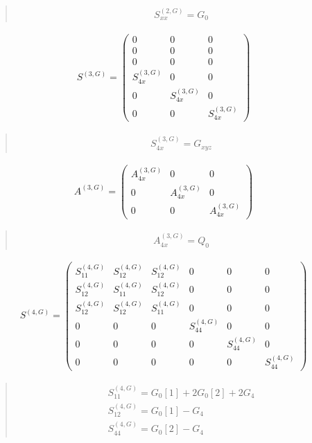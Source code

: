\documentclass[fleqn,10pt]{jsarticle}
\begin{document}
\begin{quote}
\begin{align*}
& S^{(2,G)}_{xx} = G_{0}
\end{align*}
\end{quote}
\begin{align*}
S^{(3,G)} = \begin{pmatrix} 0 & 0 & 0 \\ 0 & 0 & 0 \\ 0 & 0 & 0 \\ S^{(3,G)}_{4x} & 0 & 0 \\ 0 & S^{(3,G)}_{4x} & 0 \\ 0 & 0 & S^{(3,G)}_{4x} \end{pmatrix}
\end{align*}
\begin{quote}
\begin{align*}
& S^{(3,G)}_{4x} = G_{xyz}
\end{align*}
\end{quote}
\begin{align*}
A^{(3,G)} = \begin{pmatrix} A^{(3,G)}_{4x} & 0 & 0 \\ 0 & A^{(3,G)}_{4x} & 0 \\ 0 & 0 & A^{(3,G)}_{4x} \end{pmatrix}
\end{align*}
\begin{quote}
\begin{align*}
& A^{(3,G)}_{4x} = Q_{0}
\end{align*}
\end{quote}
\begin{align*}
S^{(4,G)} = \begin{pmatrix} S^{(4,G)}_{11} & S^{(4,G)}_{12} & S^{(4,G)}_{12} & 0 & 0 & 0 \\ S^{(4,G)}_{12} & S^{(4,G)}_{11} & S^{(4,G)}_{12} & 0 & 0 & 0 \\ S^{(4,G)}_{12} & S^{(4,G)}_{12} & S^{(4,G)}_{11} & 0 & 0 & 0 \\ 0 & 0 & 0 & S^{(4,G)}_{44} & 0 & 0 \\ 0 & 0 & 0 & 0 & S^{(4,G)}_{44} & 0 \\ 0 & 0 & 0 & 0 & 0 & S^{(4,G)}_{44} \end{pmatrix}
\end{align*}
\begin{quote}
\begin{align*}
& S^{(4,G)}_{11} = G_{0}[1] + 2 G_{0}[2] + 2 G_{4} \\
& S^{(4,G)}_{12} = G_{0}[1] - G_{4} \\
& S^{(4,G)}_{44} = G_{0}[2] - G_{4}
\end{align*}
\end{quote}
\end{document}
